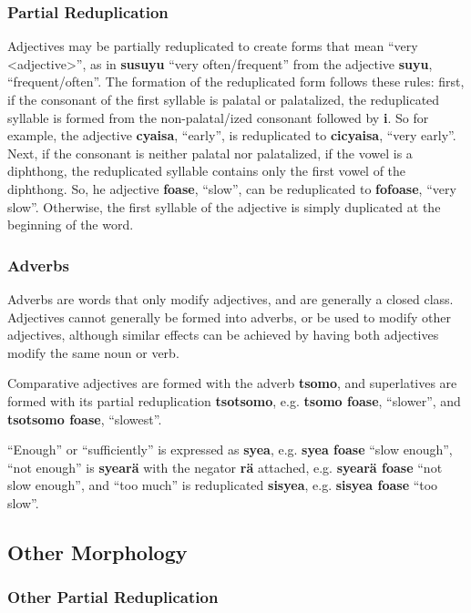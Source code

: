 \documentclass{article}
\begin{document}
\subsubsection{Partial Reduplication}

Adjectives may be partially reduplicated to create forms that mean ``very <adjective>'', as in \textbf{susuyu} ``very often/frequent'' from the adjective \textbf{suyu}, ``frequent/often''.  The formation of the reduplicated form follows these rules: first, if the consonant of the first syllable is palatal or palatalized, the reduplicated syllable is formed from the non-palatal/ized consonant followed by \textbf{i}. So for example, the adjective \textbf{cyaisa}, ``early'', is reduplicated to \textbf{cicyaisa}, ``very early''. Next, if the consonant is neither palatal nor palatalized, if the vowel is a diphthong, the reduplicated syllable contains only the first vowel of the diphthong. So, he adjective \textbf{foase}, ``slow'', can be reduplicated to \textbf{fofoase}, ``very slow''.  Otherwise, the first syllable of the adjective is simply duplicated at the beginning of the word.

\subsubsection{Adverbs}

Adverbs are words that only modify adjectives, and are generally a closed class. Adjectives cannot generally be formed into adverbs, or be used to modify other adjectives, although similar effects can be achieved by having both adjectives modify the same noun or verb.

Comparative adjectives are formed with the adverb \textbf{tsomo}, and superlatives are formed with its partial reduplication \textbf{tsotsomo}, e.g. \textbf{tsomo foase}, ``slower'', and \textbf{tsotsomo foase}, ``slowest''.

``Enough'' or ``sufficiently'' is expressed as \textbf{syea}, e.g. \textbf{syea foase} ``slow enough'', ``not enough'' is \textbf{syear\"a} with the negator \textbf{r\"a} attached, e.g. \textbf{syear\"a foase} ``not slow enough'', and ``too much'' is reduplicated \textbf{sisyea}, e.g. \textbf{sisyea foase} ``too slow''.

\subsection{Other Morphology}
\subsubsection{Other Partial Reduplication}
\end{document}
